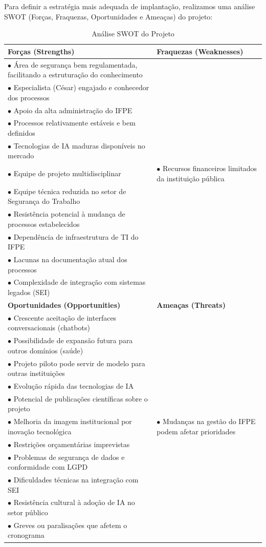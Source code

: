 \documentclass[12pt,a4paper]{article}
\begin{document}
Para definir a estratégia mais adequada de implantação, realizamos uma análise SWOT (Forças, Fraquezas, Oportunidades e Ameaças) do projeto:

\begin{table}[h]
\centering
\begin{tcolorbox}[enhanced, colback=white, colframe=gray!40, arc=3mm, boxrule=0.5pt]
\scriptsize
\begin{tabular}{|p{7cm}|p{7cm}|}
\hline
\rowcolor{green!10}
\textbf{Forças (Strengths)} & \textbf{Fraquezas (Weaknesses)} \\
\hline
$\bullet$ Área de segurança bem regulamentada, facilitando a estruturação do conhecimento\\
$\bullet$ Especialista (César) engajado e conhecedor dos processos\\
$\bullet$ Apoio da alta administração do IFPE\\
$\bullet$ Processos relativamente estáveis e bem definidos\\
$\bullet$ Tecnologias de IA maduras disponíveis no mercado\\
$\bullet$ Equipe de projeto multidisciplinar
& 
$\bullet$ Recursos financeiros limitados da instituição pública\\
$\bullet$ Equipe técnica reduzida no setor de Segurança do Trabalho\\
$\bullet$ Resistência potencial à mudança de processos estabelecidos\\
$\bullet$ Dependência de infraestrutura de TI do IFPE\\
$\bullet$ Lacunas na documentação atual dos processos\\
$\bullet$ Complexidade de integração com sistemas legados (SEI) \\
\hline
\rowcolor{blue!10}
\textbf{Oportunidades (Opportunities)} & \textbf{Ameaças (Threats)} \\
\hline
$\bullet$ Crescente aceitação de interfaces conversacionais (chatbots)\\
$\bullet$ Possibilidade de expansão futura para outros domínios (saúde)\\
$\bullet$ Projeto piloto pode servir de modelo para outras instituições\\
$\bullet$ Evolução rápida das tecnologias de IA\\
$\bullet$ Potencial de publicações científicas sobre o projeto\\
$\bullet$ Melhoria da imagem institucional por inovação tecnológica
&
$\bullet$ Mudanças na gestão do IFPE podem afetar prioridades\\
$\bullet$ Restrições orçamentárias imprevistas\\
$\bullet$ Problemas de segurança de dados e conformidade com LGPD\\
$\bullet$ Dificuldades técnicas na integração com SEI\\
$\bullet$ Resistência cultural à adoção de IA no setor público\\
$\bullet$ Greves ou paralisações que afetem o cronograma\\
\hline
\end{tabular}
\end{tcolorbox}
\caption{Análise SWOT do Projeto}
\end{table}
\end{document}
